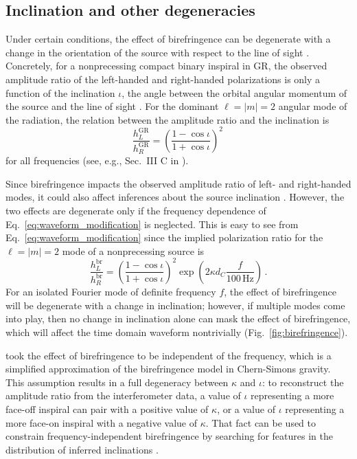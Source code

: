\documentclass[aps,prd,twocolumn,superscriptaddress,preprintnumbers,nofootinbib]{revtex4-2}
\begin{document}
\subsection{Inclination and other degeneracies}
\label{sec:inclination}

Under certain conditions, the effect of birefringence can be degenerate with a change in the orientation of the source with respect to the line of sight \cite{Alexander:2009tp}.
Concretely, for a nonprecessing compact binary inspiral in \ac{GR}, the observed amplitude ratio of the left-handed and right-handed polarizations is only a function of the inclination $\iota$, the angle between the orbital angular momentum of the source and the line of sight \cite{Blanchet:2013haa}.
For  the dominant $\ell = |m| = 2$ angular mode of the radiation, the relation between the amplitude ratio and the inclination is
\begin{equation}
    \frac{h_{L}^\mathrm{GR}}{h^\mathrm{GR}_{R}}=\left(\frac{1-\cos\iota}{1+\cos\iota}\right)^2\,
\end{equation}
for all frequencies (see, e.g., Sec.~III C in \cite{Isi:2022mbx}).

Since birefringence impacts the observed amplitude ratio of left- and right-handed modes, it could also affect inferences about the source inclination \cite{Alexander:2009tp}.
However, the two effects are degenerate only if the frequency dependence of Eq.~\eqref{eq:waveform_modification} is neglected.
This is easy to see from Eq.~\eqref{eq:waveform_modification} since the implied polarization ratio for the $\ell = |m| = 2$ mode of a nonprecessing source is
\begin{equation}
    \frac{h_{L}^\mathrm{br}}{h_{R}^\mathrm{br}}=\left(\frac{1-\cos\iota}{1+\cos\iota}\right)^2
    \exp\left(2\kappa d_C \frac{f}{100\, \mathrm{Hz}}\right)\, .
    \label{eq:modified_amplitude_ratio}
\end{equation}
For an isolated Fourier mode of definite frequency $f$, the effect of birefringence will be degenerate with a change in inclination; however, if multiple modes come into play, then no change in inclination alone can mask the effect of birefringence, which will affect the time domain waveform nontrivially (Fig.~\ref{fig:birefringence}).

\citet{Okounkova_2022} took the effect of birefringence to be independent of the frequency, which is a simplified approximation of the birefringence model in Chern-Simons gravity.
This assumption results in a full degeneracy between $\kappa$ and $\iota$:
to reconstruct the amplitude ratio from the interferometer data, a value of $\iota$ representing a more face-off inspiral can pair with a positive value of $\kappa$, or a value of $\iota$ representing a more face-on inspiral with a negative value of $\kappa$.
That fact can be used to constrain frequency-independent birefringence by searching for features in the distribution of inferred inclinations \cite{Okounkova_2022}.
\end{document}
